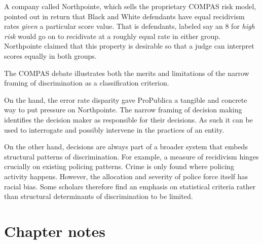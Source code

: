 \documentclass{tufte-book}
\begin{document}
A company called Northpointe, which sells the proprietary COMPAS risk
model, pointed out in return that Black and White defendants have equal
recidivism rates \emph{given} a particular score value. That is
defendants, labeled say an 8 for \emph{high risk} would go on to
recidivate at a roughly equal rate in either group. Northpointe claimed
that this property is desirable so that a judge can interpret scores
equally in both groups.

The COMPAS debate illustrates both the merits and limitations of the
narrow framing of discrimination as a classification criterion.

On the hand, the error rate disparity gave ProPublica a tangible and
concrete way to put pressure on Northpointe. The narrow framing of
decision making identifies the decision maker as responsible for their
decisions. As such it can be used to interrogate and possibly intervene
in the practices of an entity.

On the other hand, decisions are always part of a broader system that
embeds structural patterns of discrimination. For example, a measure of
recidivism hinges crucially on existing policing patterns. Crime is only
found where policing activity happens. However, the allocation and
severity of police force itself has racial bias. Some scholars therefore
find an emphasis on statistical criteria rather than structural
determinants of discrimination to be limited.

\hypertarget{chapter-notes-1}{%
\section{Chapter notes}\label{chapter-notes-1}}
\end{document}
